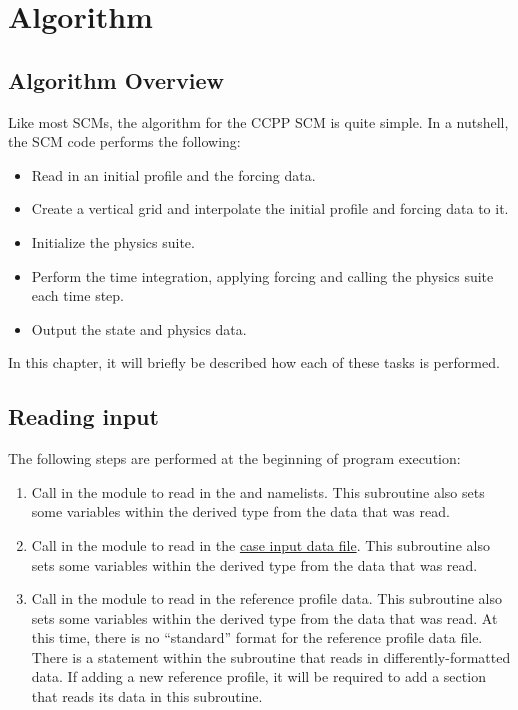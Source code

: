 \chapter{Algorithm}
\label{chapter: algorithm}

\section{Algorithm Overview}

Like most SCMs, the algorithm for the CCPP SCM is quite simple. In a nutshell, the SCM code performs the following:
\begin{itemize}
\item Read in an initial profile and the forcing data.
\item Create a vertical grid and interpolate the initial profile and forcing data to it.
\item Initialize the physics suite.
\item Perform the time integration, applying forcing and calling the physics suite each time step.
\item Output the state and physics data.
\end{itemize}
In this chapter, it will briefly be described how each of these tasks is performed.

\section{Reading input}
The following steps are performed at the beginning of program execution:
\begin{enumerate}
\item Call  in the  module to read in the \hyperref[subsection: case config]{} and \hyperref[subsection: physics config]{} namelists. This subroutine also sets some variables within the  derived type from the data that was read.
\item Call  in the  module to read in the \hyperref[subsection: case input]{case input data file}. This subroutine also sets some variables within the  derived type from the data that was read.
\item Call  in the  module to read in the reference profile data. This subroutine also sets some variables within the  derived type from the data that was read. At this time, there is no ``standard'' format for the reference profile data file. There is a  statement within the  subroutine that reads in differently-formatted data. If adding a new reference profile, it will be required to add a section that reads its data in this subroutine.
\end{enumerate}

